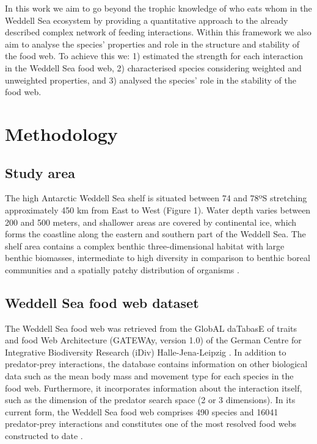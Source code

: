 \documentclass[gc, manuscript]{copernicus}
\begin{document}
In this work we aim to go beyond the trophic knowledge of who eats whom
in the Weddell Sea ecosystem by providing a quantitative approach to the
already described complex network of feeding interactions. Within this
framework we also aim to analyse the species' properties and role in the
structure and stability of the food web. To achieve this we: 1)
estimated the strength for each interaction in the Weddell Sea food web,
2) characterised species considering weighted and unweighted properties,
and 3) analysed the species' role in the stability of the food web.

\section{Methodology}

\subsection{Study area}

The high Antarctic Weddell Sea shelf is situated between 74 and 78ºS
stretching approximately 450 km from East to West (Figure 1). Water
depth varies between 200 and 500 meters, and shallower areas are covered
by continental ice, which forms the coastline along the eastern and
southern part of the Weddell Sea. The shelf area contains a complex
benthic three-dimensional habitat with large benthic biomasses,
intermediate to high diversity in comparison to benthic boreal
communities and a spatially patchy distribution of organisms
\citep{Dayton1990, Teixido2002}.

\subsection{Weddell Sea food web dataset}

The Weddell Sea food web was retrieved from the GlobAL daTabasE of
traits and food Web Architecture (GATEWAy, version 1.0) of the German
Centre for Integrative Biodiversity Research (iDiv) Halle-Jena-Leipzig
\citep{Brose2018}. In addition to predator-prey interactions, the
database contains information on other biological data such as the mean
body mass and movement type for each species in the food web.
Furthermore, it incorporates information about the interaction itself,
such as the dimension of the predator search space (2 or 3 dimensions).
In its current form, the Weddell Sea food web comprises 490 species and
16041 predator-prey interactions and constitutes one of the most
resolved food webs constructed to date \citep{Jacob2011}.
\end{document}

